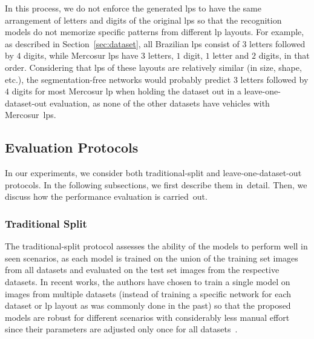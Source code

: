In this process, we do not enforce the generated \glspl*{lp} to have the same arrangement of letters and digits of the original \glspl*{lp} so that the recognition models do not memorize specific patterns from different \gls*{lp} layouts.
For example, as described in Section~\ref{sec:dataset}, all Brazilian \glspl*{lp} consist of $3$ letters followed by $4$ digits, while Mercosur \glspl*{lp} have $3$ letters, $1$ digit, $1$ letter and $2$ digits, in that order.
Considering that \glspl*{lp} of these layouts are relatively similar (in size, shape, etc.), the segmentation-free networks would probably predict $3$ letters followed by $4$ digits for most Mercosur \gls*{lp} when holding the \dataset dataset out in a leave-one-dataset-out evaluation, as none of the other datasets have vehicles with Mercosur~\glspl*{lp}.

\subsection{Evaluation Protocols}
\label{sec:experiments-protocol}

In our experiments, we consider both traditional-split and leave-one-dataset-out protocols.
In the following subsections, we first describe them in~detail.
Then, we discuss how the performance evaluation is carried~out.

\subsubsection{Traditional Split}
\label{sec:experiments-protocol:traditional-split}

The traditional-split protocol assesses the ability of the models to perform well in seen scenarios, as each model is trained on the union of the training set images from all datasets and evaluated on the test set images from the respective datasets.
In recent works, the authors have chosen to train a single model on images from multiple datasets (instead of training a specific network for each dataset or \gls*{lp} layout as was commonly done in the past) so that the proposed models are robust for different scenarios with considerably less manual effort since their parameters are adjusted only once for all datasets~\citep{selmi2020delpdar,laroca2021efficient,silva2022flexible}.

